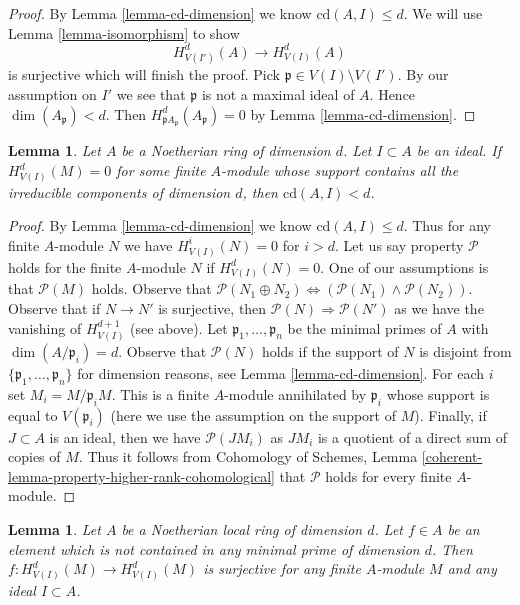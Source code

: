 \documentclass{stacks-project}
\theoremstyle{plain}
\newtheorem{lemma}[subsection]{Lemma}
\theoremstyle{definition}
\theoremstyle{remark}
\numberwithin{equation}{subsection}
\begin{document}
\begin{proof}
By Lemma \ref{lemma-cd-dimension} we know $\text{cd}(A, I) \leq d$.
We will use Lemma \ref{lemma-isomorphism} to show
$$
H^d_{V(I')}(A) \to H^d_{V(I)}(A)
$$
is surjective which will finish the proof. Pick
$\mathfrak p \in V(I) \setminus V(I')$. By our assumption
on $I'$ we see that $\mathfrak p$ is not a maximal ideal of $A$.
Hence $\dim(A_\mathfrak p) < d$. Then
$H^d_{\mathfrak pA_\mathfrak p}(A_\mathfrak p) = 0$
by Lemma \ref{lemma-cd-dimension}.
\end{proof}

\begin{lemma}
\label{lemma-cd-top-vanishing-some-module}
Let $A$ be a Noetherian ring of dimension $d$. Let $I \subset A$
be an ideal. If $H^d_{V(I)}(M) = 0$ for some finite $A$-module
whose support contains all the irreducible components of
dimension $d$, then $\text{cd}(A, I) < d$.
\end{lemma}

\begin{proof}
By Lemma \ref{lemma-cd-dimension} we know $\text{cd}(A, I) \leq d$.
Thus for any finite $A$-module $N$ we have $H^i_{V(I)}(N) = 0$
for $i > d$. Let us say property $\mathcal{P}$ holds for the
finite $A$-module $N$ if $H^d_{V(I)}(N) = 0$.
One of our assumptions is that $\mathcal{P}(M)$ holds.
Observe that $\mathcal{P}(N_1 \oplus N_2)
\Leftrightarrow (\mathcal{P}(N_1) \wedge \mathcal{P}(N_2))$.
Observe that if $N \to N'$ is surjective, then
$\mathcal{P}(N) \Rightarrow \mathcal{P}(N')$ as we
have the vanishing of $H^{d + 1}_{V(I)}$ (see above).
Let $\mathfrak p_1, \ldots, \mathfrak p_n$ be the
minimal primes of $A$ with $\dim(A/\mathfrak p_i) = d$.
Observe that $\mathcal{P}(N)$ holds if the support
of $N$ is disjoint from $\{\mathfrak p_1, \ldots, \mathfrak p_n\}$
for dimension reasons, see Lemma \ref{lemma-cd-dimension}.
For each $i$ set $M_i = M/\mathfrak p_i M$.
This is a finite $A$-module annihilated by $\mathfrak p_i$
whose support is equal to
$V(\mathfrak p_i)$ (here we use the assumption on the support of $M$).
Finally, if $J \subset A$ is an ideal, then we have $\mathcal{P}(JM_i)$
as $JM_i$ is a quotient of a direct sum of copies of $M$.
Thus it follows from Cohomology of Schemes, Lemma
\ref{coherent-lemma-property-higher-rank-cohomological}
that $\mathcal{P}$ holds for every finite $A$-module.
\end{proof}

\begin{lemma}
\label{lemma-top-coh-divisible}
Let $A$ be a Noetherian local ring of dimension $d$. Let $f \in A$
be an element which is not contained in any minimal prime of
dimension $d$. Then $f : H^d_{V(I)}(M) \to H^d_{V(I)}(M)$
is surjective for any finite $A$-module $M$ and any ideal $I \subset A$.
\end{lemma}
\end{document}
